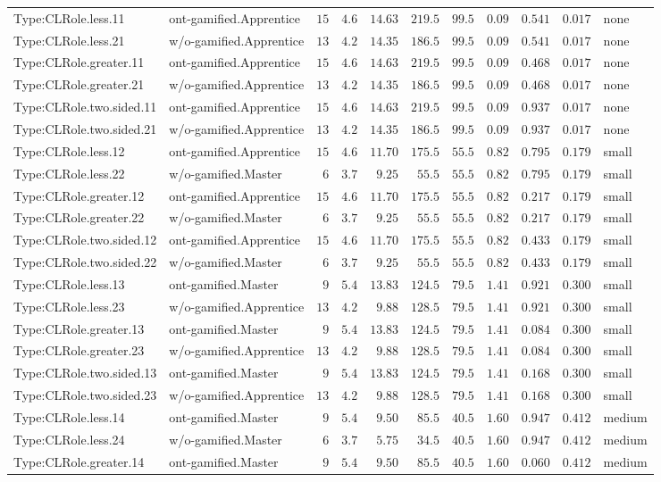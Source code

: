 \documentclass[6pt,a4paper]{article}
\begin{document}
{\begin{longtable}{llrrrrrrrrl}
Type:CLRole.less.11&ont-gamified.Apprentice&$15$&$4.6$&$14.63$&$219.5$&$ 99.5$&$ 0.09$&$0.541$&$0.017$&none\tabularnewline
Type:CLRole.less.21&w/o-gamified.Apprentice&$13$&$4.2$&$14.35$&$186.5$&$ 99.5$&$ 0.09$&$0.541$&$0.017$&none\tabularnewline
Type:CLRole.greater.11&ont-gamified.Apprentice&$15$&$4.6$&$14.63$&$219.5$&$ 99.5$&$ 0.09$&$0.468$&$0.017$&none\tabularnewline
Type:CLRole.greater.21&w/o-gamified.Apprentice&$13$&$4.2$&$14.35$&$186.5$&$ 99.5$&$ 0.09$&$0.468$&$0.017$&none\tabularnewline
Type:CLRole.two.sided.11&ont-gamified.Apprentice&$15$&$4.6$&$14.63$&$219.5$&$ 99.5$&$ 0.09$&$0.937$&$0.017$&none\tabularnewline
Type:CLRole.two.sided.21&w/o-gamified.Apprentice&$13$&$4.2$&$14.35$&$186.5$&$ 99.5$&$ 0.09$&$0.937$&$0.017$&none\tabularnewline
Type:CLRole.less.12&ont-gamified.Apprentice&$15$&$4.6$&$11.70$&$175.5$&$ 55.5$&$ 0.82$&$0.795$&$0.179$&small\tabularnewline
Type:CLRole.less.22&w/o-gamified.Master&$ 6$&$3.7$&$ 9.25$&$ 55.5$&$ 55.5$&$ 0.82$&$0.795$&$0.179$&small\tabularnewline
Type:CLRole.greater.12&ont-gamified.Apprentice&$15$&$4.6$&$11.70$&$175.5$&$ 55.5$&$ 0.82$&$0.217$&$0.179$&small\tabularnewline
Type:CLRole.greater.22&w/o-gamified.Master&$ 6$&$3.7$&$ 9.25$&$ 55.5$&$ 55.5$&$ 0.82$&$0.217$&$0.179$&small\tabularnewline
Type:CLRole.two.sided.12&ont-gamified.Apprentice&$15$&$4.6$&$11.70$&$175.5$&$ 55.5$&$ 0.82$&$0.433$&$0.179$&small\tabularnewline
Type:CLRole.two.sided.22&w/o-gamified.Master&$ 6$&$3.7$&$ 9.25$&$ 55.5$&$ 55.5$&$ 0.82$&$0.433$&$0.179$&small\tabularnewline
Type:CLRole.less.13&ont-gamified.Master&$ 9$&$5.4$&$13.83$&$124.5$&$ 79.5$&$ 1.41$&$0.921$&$0.300$&small\tabularnewline
Type:CLRole.less.23&w/o-gamified.Apprentice&$13$&$4.2$&$ 9.88$&$128.5$&$ 79.5$&$ 1.41$&$0.921$&$0.300$&small\tabularnewline
Type:CLRole.greater.13&ont-gamified.Master&$ 9$&$5.4$&$13.83$&$124.5$&$ 79.5$&$ 1.41$&$0.084$&$0.300$&small\tabularnewline
Type:CLRole.greater.23&w/o-gamified.Apprentice&$13$&$4.2$&$ 9.88$&$128.5$&$ 79.5$&$ 1.41$&$0.084$&$0.300$&small\tabularnewline
Type:CLRole.two.sided.13&ont-gamified.Master&$ 9$&$5.4$&$13.83$&$124.5$&$ 79.5$&$ 1.41$&$0.168$&$0.300$&small\tabularnewline
Type:CLRole.two.sided.23&w/o-gamified.Apprentice&$13$&$4.2$&$ 9.88$&$128.5$&$ 79.5$&$ 1.41$&$0.168$&$0.300$&small\tabularnewline
Type:CLRole.less.14&ont-gamified.Master&$ 9$&$5.4$&$ 9.50$&$ 85.5$&$ 40.5$&$ 1.60$&$0.947$&$0.412$&medium\tabularnewline
Type:CLRole.less.24&w/o-gamified.Master&$ 6$&$3.7$&$ 5.75$&$ 34.5$&$ 40.5$&$ 1.60$&$0.947$&$0.412$&medium\tabularnewline
Type:CLRole.greater.14&ont-gamified.Master&$ 9$&$5.4$&$ 9.50$&$ 85.5$&$ 40.5$&$ 1.60$&$0.060$&$0.412$&medium\tabularnewline

\end{longtable}}
\end{document}
